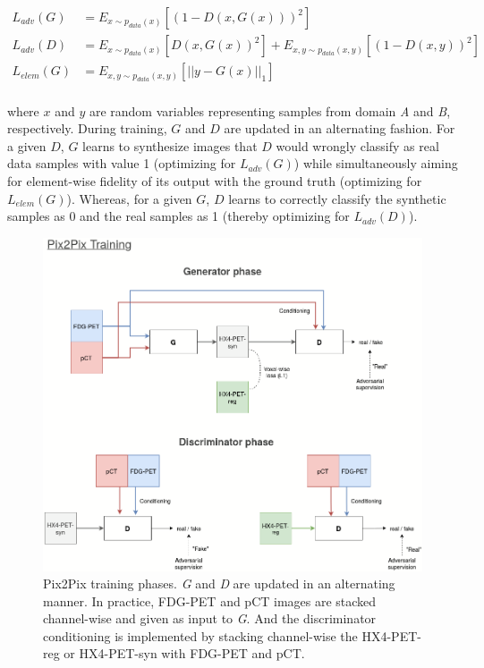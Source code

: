 \begin{equation}
    \begin{aligned}
    L_{adv}(G) &= E_{x \sim p_{data}(x)} [(1 - D(x, G(x)))^2]  \\
    L_{adv}(D) &= E_{x \sim p_{data}(x)} [D(x, G(x))^2] + E_{x,y \sim p_{data}(x,y)} [(1 - D(x,y))^2] \\
    L_{elem}(G) &= E_{x,y \sim p_{data}(x,y)} [|| y - G(x) ||_1]  \\
    \end{aligned}
    \label{eq:pix2pix_loss_expansion}
\end{equation}

where $x$ and $y$ are random variables representing samples from domain \textit{A} and \textit{B}, respectively. During training, $G$ and $D$ are updated in an alternating fashion. For a given $D$, $G$ learns to synthesize images that $D$ would wrongly classify as real data samples with value 1 (optimizing for $L_{adv}(G)$) while simultaneously aiming for element-wise fidelity of its output with the ground truth (optimizing for $L_{elem}(G)$). Whereas, for a given $G$, $D$ learns to correctly classify the synthetic samples as 0 and the real samples as 1 (thereby optimizing for $L_{adv}(D)$).

\begin{figure}[h!]
    \centering
    \includegraphics[width=0.9\linewidth]{figures/GANs/Pix2Pix.png}
    \caption{Pix2Pix training phases. \textit{G} and \textit{D} are updated in an alternating manner. In practice, FDG-PET and pCT images are stacked channel-wise and given as input to \textit{G}. And the discriminator conditioning is implemented by stacking channel-wise the HX4-PET-reg or HX4-PET-syn with FDG-PET and pCT.}
    \label{fig:pix2pix}
\end{figure}{}

